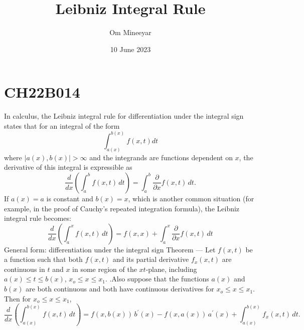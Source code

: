 \documentclass{article}
\title{Leibniz Integral Rule}
\author{Om Mineeyar}
\date{10 June 2023}
\begin{document}
\maketitle

\section*{CH22B014}
In calculus, the Leibniz integral rule for differentiation under the integral sign states that for an integral of the form
\begin{equation}
	\int_{a(x)}^{b(x)}{f(x,t)dt}
\end{equation}
where $|{a(x),b(x)}|>{\infty}$ and the integrands are functions dependent on $x$, the derivative of this integral is expressible as
\begin{equation}
    {\displaystyle {\frac {d}{dx}}\left(\int _{a}^{b}f(x,t)\,dt\right)=\int _{a}^{b}{\frac {\partial }{\partial x}}f(x,t)\,dt.}
\end{equation}
If $a(x)=a$ is constant and $b(x)=x$, which is another common situation (for example, in the proof of Cauchy's repeated integration formula), the Leibniz integral rule becomes:
\begin{equation}
{{\frac {d}{dx}}\left(\int _{a}^{x}f(x,t)\,dt\right)=f{(x,x)}+\int _{a}^{x}{\frac {\partial }{\partial x}}f(x,t)\,dt}
\end{equation}
\Large{General form: differentiation under the integral sign}
\normalsize
\newline
\newline
Theorem — Let $f(x,t)$ be a function such that both $f(x,t)$ and its partial derivative $f_{x}(x,t)$ are continuous in $t$ and $x$ in some region of the 
$xt$-plane, including $a(x){\le}t{\le}b(x)$, $x_o{\le}x{\le}x_1$. .Also suppose that the functions $a(x)$ and $b(x)$ are both continuous and both have continuous derivatives for  $x_o{\le}x{\le}x_1$. Then for  $x_o{\le}x{\le}x_1$,
\begin{equation}
{{\frac {d}{dx}}\left(\int _{a(x)}^{b(x)}f(x,t)\,dt\right)=f(x,b(x))\,b^{\prime }(x)-f(x,a(x))\,a^{\prime }(x)+\displaystyle \int _{a(x)}^{b(x)}f_{x}(x,t)\,dt.}
\end{equation}
\end{document}
